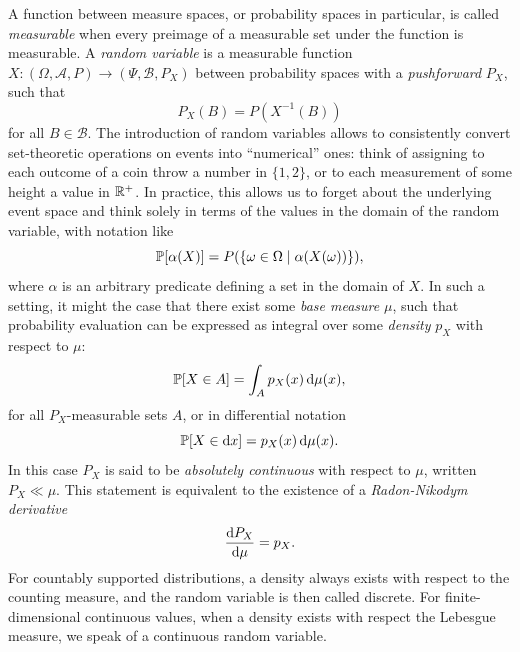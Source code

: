 A function between measure spaces, or probability spaces in particular, is called \emph{measurable}
when every preimage of a measurable set under the function is measurable.  A \emph{random variable}
is a measurable function \(X : (\Omega, \mathcal{A}, P) \to (\Psi, \mathcal{B}, P_X)\) between
probability spaces with a \emph{pushforward} \(P_X\), such that
\begin{equation}
  \label{eq:pushforward}
  P_X(B) = P(X^{-1}(B))
\end{equation}
for all \(B \in \mathcal{B}\).  The introduction of random variables allows to consistently convert
set-theoretic operations on events into \enquote{numerical} ones: think of assigning to each outcome
of a coin throw a number in \(\{1, 2\}\), or to each measurement of some height a value in
\(\mathbb{R}^{+}\).  In practice, this allows us to forget about the underlying event space and think
solely in terms of the values in the domain of the random variable, with notation like
\begin{equation}
  \label{eq:prob-notation}
  \Prob{\alpha(X)} = P(\{\omega \in \Omega \mid \alpha(X(\omega))\}),
\end{equation}
where \(\alpha\) is an arbitrary predicate defining a set in the domain of \(X\).  In such a
setting, it might the case that there exist some \emph{base measure} \(\mu\), such that probability
evaluation can be expressed as integral over some \emph{density} \(p_X\) with respect to \(\mu\):
\begin{equation}
  \label{eq:measure-integral}
  \Prob{X \in A} = \int_{A} \prob[X]{x} \dif\mu(x),
\end{equation}
for all \(P_X\)-measurable sets \(A\), or in differential notation
\begin{equation}
  \label{eq:measure-differential}
  \Prob{X \in \dif x} = \prob[X]{x} \dif\mu(x).
\end{equation}
In this case \(P_X\) is said to be \emph{absolutely continuous} with respect to \(\mu\), written
\(P_X \ll \mu\).  This statement is equivalent to the existence of a \emph{Radon-Nikodym derivative}
\begin{equation}
  \label{eq:radon-nikodym}
  \frac{\dif P_{X}}{\dif \mu} = p_{X}.
\end{equation}
For countably supported distributions, a density always exists with respect to the counting measure,
and the random variable is then called discrete.  For finite-dimensional continuous values, when a
density exists with respect the Lebesgue measure, we speak of a continuous random variable.




